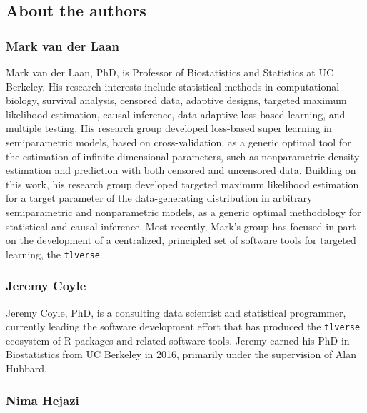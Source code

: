 \documentclass[12pt, krantz2,]{krantz}
\theoremstyle{definition}
\theoremstyle{definition}
\theoremstyle{definition}
\newcommand{\1}{\mathbbm{1}}
\begin{document}
\hypertarget{about-the-authors}{%
\subsection*{About the authors}\label{about-the-authors}}


\hypertarget{mark-van-der-laan}{%
\subsubsection*{Mark van der Laan}\label{mark-van-der-laan}}


Mark van der Laan, PhD, is Professor of Biostatistics and Statistics at UC
Berkeley. His research interests include statistical methods in computational
biology, survival analysis, censored data, adaptive designs, targeted maximum
likelihood estimation, causal inference, data-adaptive loss-based learning, and
multiple testing. His research group developed loss-based super learning in
semiparametric models, based on cross-validation, as a generic optimal tool for
the estimation of infinite-dimensional parameters, such as nonparametric density
estimation and prediction with both censored and uncensored data. Building on
this work, his research group developed targeted maximum likelihood estimation
for a target parameter of the data-generating distribution in arbitrary
semiparametric and nonparametric models, as a generic optimal methodology for
statistical and causal inference. Most recently, Mark's group has focused in
part on the development of a centralized, principled set of software tools for
targeted learning, the \texttt{tlverse}.

\hypertarget{jeremy-coyle}{%
\subsubsection*{Jeremy Coyle}\label{jeremy-coyle}}


Jeremy Coyle, PhD, is a consulting data scientist and statistical programmer,
currently leading the software development effort that has produced the
\texttt{tlverse} ecosystem of R packages and related software tools. Jeremy earned his
PhD in Biostatistics from UC Berkeley in 2016, primarily under the supervision
of Alan Hubbard.

\hypertarget{nima-hejazi}{%
\subsubsection*{Nima Hejazi}\label{nima-hejazi}}
\end{document}
